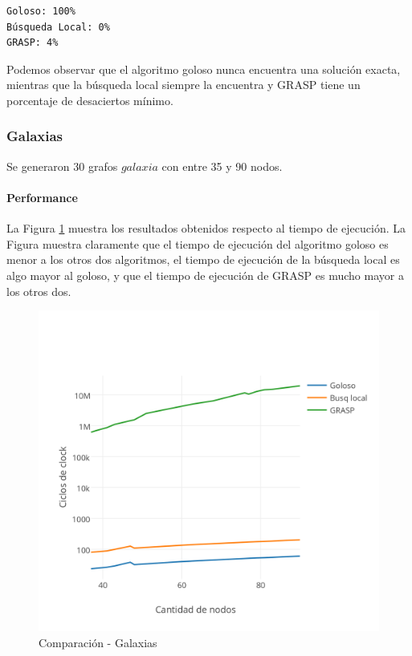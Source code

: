 \begin{verbatim}
Goloso: 100%
Búsqueda Local: 0%
GRASP: 4%
\end{verbatim}

Podemos observar que el algoritmo goloso nunca encuentra una solución exacta, mientras que la búsqueda local siempre la encuentra y GRASP tiene un porcentaje de desaciertos mínimo.

\subsubsection{Galaxias}

Se generaron 30 grafos $galaxia$ con entre 35 y 90 nodos.

\paragraph{Performance}

La Figura \ref{fig:5C} muestra los resultados obtenidos respecto al tiempo de ejecución. La Figura muestra claramente que el tiempo de ejecución del algoritmo goloso es menor a los otros dos algoritmos, el tiempo de ejecución de la búsqueda local es algo mayor al goloso, y que el tiempo de ejecución de GRASP es mucho mayor a los otros dos.

\begin{figure}[htb]
	\begin{center}
    		\includegraphics[scale=0.8]{imagenes/final-galaxias.png}
	\end{center}
	\caption{Comparación - Galaxias}\label{fig:5C}
\end{figure}

